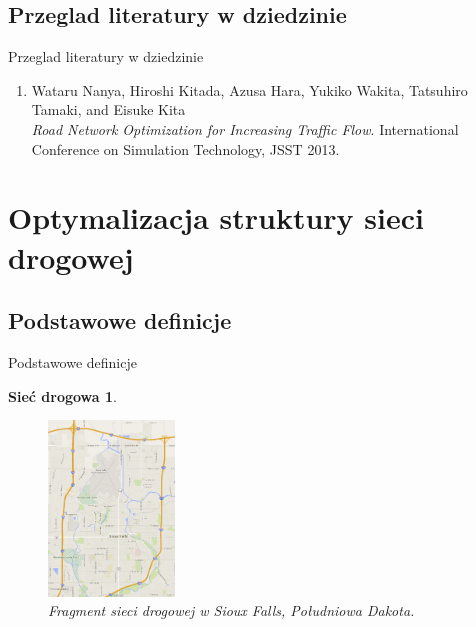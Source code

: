 \documentclass{beamer}
\begin{document}
\subsection{Przeglad literatury w dziedzinie}
\begin{frame}{Przeglad literatury w dziedzinie} 

\begin{enumerate}

\item {
Wataru Nanya, Hiroshi Kitada, Azusa Hara, Yukiko Wakita, Tatsuhiro Tamaki, and Eisuke Kita\\
\emph{Road Network Optimization for Increasing Traffic Flow}. International Conference on Simulation Technology, JSST 2013.}

\end{enumerate}
\end{frame}


\section{Optymalizacja struktury sieci drogowej}
\subsection{Podstawowe definicje}
\begin{frame}{Podstawowe definicje} 

\newtheorem{mydef1}{Sieć drogowa}
\begin{mydef1}
	\begin{figure}[h!]
	\includegraphics[width=0.30\textwidth]{img/siec}
	\caption{Fragment sieci drogowej w Sioux Falls, Południowa Dakota.} 
	\end{figure}
\end{mydef1}

\end{frame}
\end{document}
